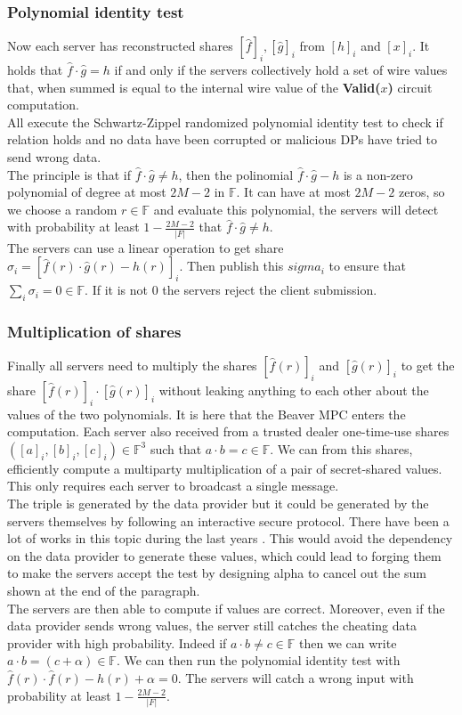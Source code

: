 \documentclass{article}
\begin{document}
\subsubsection{Polynomial identity test}
Now each server has reconstructed shares $[\hat{f}]_i, [\hat{g}]_i$ from $[h]_i$ and $[x]_i$. It holds that $ \hat{f} \cdot \hat{g} = h$ if and only if the servers collectively hold a set of wire values that, when summed is equal to the internal wire value of the \textbf{Valid($x$)} circuit computation.\\
All execute the Schwartz-Zippel randomized polynomial identity test \cite{polyverif} to check if relation holds and no data have been corrupted or malicious DPs have tried to send wrong data.\\
The principle is that if $ \hat{f} \cdot \hat{g} \neq h$, then the polinomial $ \hat{f} \cdot \hat{g} - h$ is a non-zero polynomial of degree at most $2M-2$ in $\mathbb{F}$. It can have at most $2M-2$ zeros, so we choose a random $r \in \mathbb{F}$ and evaluate this polynomial, the servers will detect with probability at least $1 - \frac{2M-2}{|F|}$ that $ \hat{f} \cdot \hat{g} \neq h$.\\
The servers can use a linear operation to get share $\sigma_i = [ \hat{f}(r) \cdot \hat{g}(r) - h(r)]_i$. Then publish this $sigma_i$ to ensure that $\sum_{i}{\sigma_i} = 0 \in \mathbb{F}$. If it is not $0$ the servers reject the client submission.
\subsubsection{Multiplication of shares}
Finally all servers need to multiply the shares $ [\hat{f}(r)]_i $ and $ [\hat{g}(r)]_i$ to get the share $[\hat{f}(r)]_i \cdot [\hat{g}(r)]_i$ without leaking anything to each other about the values of the two polynomials. It is here that the Beaver MPC enters the computation. Each server also received from a trusted dealer one-time-use shares $([a]_i,[b]_i,[c]_i) \in \mathbb{F}^3 $ such that $a \cdot b = c \in \mathbb{F}$. We can from this shares, efficiently compute a multiparty multiplication of a pair of secret-shared values. This only requires each server to broadcast a single message.\\
The triple is generated by the data provider but it could be generated by the servers themselves by following an interactive secure protocol. There have been a lot of works in this topic during the last years \cite{auth}. This would avoid the dependency on the data provider to generate these values, which could lead to forging them to make the servers accept the test by designing alpha to cancel out the sum shown at the end of the paragraph.\\
The servers are then able to compute if values are correct. Moreover, even if the data provider sends wrong values, the server still catches the cheating data provider with high probability. Indeed if $a \cdot b \neq c \in \mathbb{F}$ then we can write $a \cdot b = (c + \alpha) \in \mathbb{F}$. We can then run the polynomial identity test with $\hat{f}(r) \cdot \hat{f}(r) - h(r) + \alpha = 0$. The servers will catch a wrong input with probability at least $1 - \frac{2M-2}{|F|}$.
\end{document}
